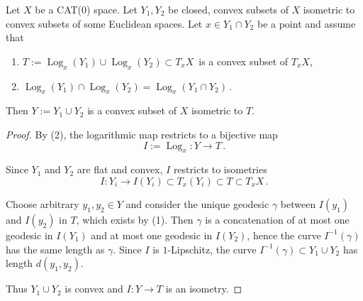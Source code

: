 \documentclass[10pt,a4paper]{amsart}
\begin{document}
\begin{lem} \label{lem: final}
	Let $X$ be a CAT(0) space.  Let $Y_1,Y_2 $ be closed, convex subsets of $X$ isometric to convex subsets of some Euclidean spaces.  Let $x\in  Y_1\cap Y_2$ be a point and assume that
	\begin{enumerate} 
	\item $T:={\operatorname{Log}}_x (Y_1) \cup {\operatorname{Log}}_x (Y_2) \subset T_xX \,$ is a convex subset of $T_xX$,
	\item ${\operatorname{Log}}_x (Y_1) \cap {\operatorname{Log}}_x (Y_2) ={\operatorname{Log}}_x (Y_1\cap Y_2)\,.$
	\end{enumerate}
	Then $Y:=Y_1\cup Y_2$ is a  convex subset of $X$ isometric to $T$. 
\end{lem}

	\begin{proof}
		By (2), the logarithmic map restricts to a bijective map
	$$I:=\operatorname{Log}_x :Y\to T\,.$$ 	
		
		
Since $Y_1$ and $Y_2$ are flat and convex, $I$ restricts to isometries
 $$I: Y_i \to I(Y_i)\subset T_x (Y_i)\subset T\subset T_xX\,.$$		 
		
	
		
		Choose arbitrary $y_1,y_2\in Y$ and consider the unique geodesic  $\gamma$ between $I(y_1)$ and $I(y_2)$ in $T$, which exists by (1).  Then $\gamma$ is a concatenation of at most one geodesic in $I(Y_1)$ and at most one geodesic in $I(Y_2)$, hence  the curve $I^{-1}(\gamma)$ has the same length as $\gamma$.  Since $I$ is $1$-Lipschitz, 
		 the curve $I^{-1} (\gamma) \subset Y_1\cup Y_2$  has length $d(y_1,y_2)$.
		 
	 
		 Thus $Y_1\cup Y_2$ is convex and $I:Y\to T$ is an isometry.
	\end{proof}
\end{document}
